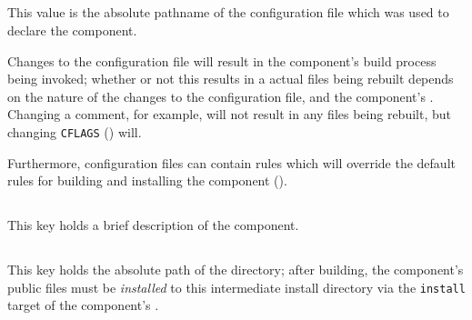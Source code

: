 \subsection{}\label{variables:configuration-file}

This value is the absolute pathname of the configuration file which
was used to declare the component.

Changes to the configuration file will result in the component's build
process being invoked; whether or not this results in a actual files
being rebuilt depends on the nature of the changes to the
configuration file, and the component's \makefile.  Changing a
comment, for example, will not result in any files being rebuilt, but
changing \texttt{CFLAGS} () will.

Furthermore, configuration files can contain \makefile rules which
will override the default rules for building and installing the
component ().

%


\subsection{}\label{variables:description}

This key holds a brief description of the component.


\subsection{}\label{variables:destdir-directory}

This key holds the absolute path of the \destdir directory; after
building, the component's public files must be \emph{installed} to this
intermediate install directory via the \texttt{install} target of the
component's \makefile.

